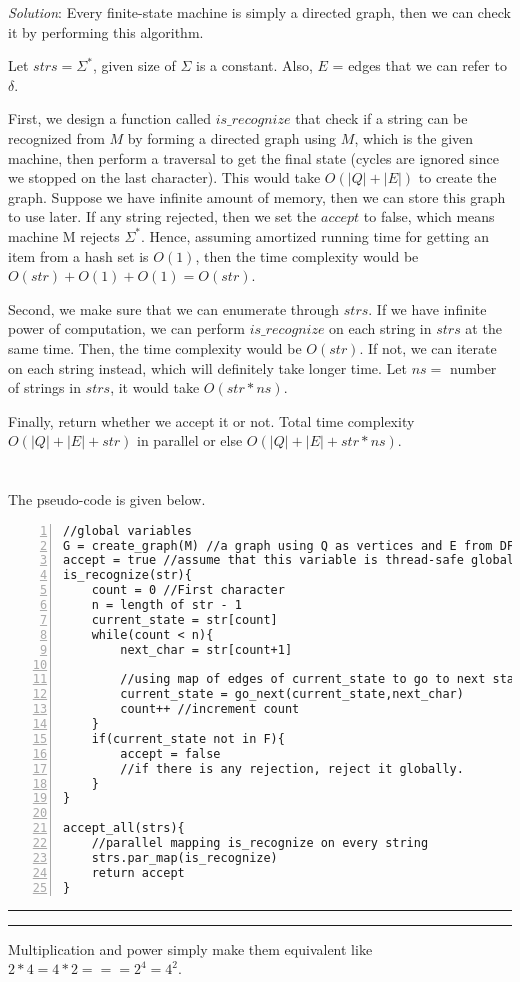 \documentclass[a4paper, 11pt]{article}
\newcommand{\question}[2] {\vspace{.25in} \hrule\vspace{0.5em}
	\noindent{\bf #1: #2} \vspace{0.5em}
	\hrule \vspace{.10in}}
\begin{document}
	{\em Solution}: Every finite-state machine is simply a directed graph, then we can check it by performing this algorithm.
	
	Let $strs = \Sigma^*$, given size of $\Sigma$ is a constant. Also, $E$ = edges that we can refer to $\delta$.
	
	First, we design a function called $is\_recognize$ that check if a string can be recognized from $M$ by forming a directed graph using $M$, which is the given machine, then perform a traversal to get the final state (cycles are ignored since we stopped on the last character). This would take $O(|Q|+|E|)$ to create the graph. Suppose we have infinite amount of memory, then we can store this graph to use later. If any string rejected, then we set the $accept$ to false, which means machine M rejects $\Sigma^*$. Hence, assuming amortized running time for getting an item from a hash set is $O(1)$, then the time complexity would be $O(str)+O(1)+O(1) = O(str)$.
	
	Second, we make sure that we can enumerate through $strs$. If we have infinite power of computation, we can perform $is\_recognize$ on each string in $strs$ at the same time. Then, the time complexity would be $O(str)$. If not, we can iterate on each string instead, which will definitely take longer time. Let $ns =$ number of strings in $strs$, it would take $O(str*{ns})$.
	
	Finally, return whether we accept it or not. Total time complexity $O(|Q|+|E|+str)$ in parallel or else $O(|Q|+|E|+str*{ns})$.
	\\\\\\
	The pseudo-code is given below.
	
\begin{Verbatim}[numbers=left]
//global variables
G = create_graph(M) //a graph using Q as vertices and E from DFA
accept = true //assume that this variable is thread-safe globally
is_recognize(str){
	count = 0 //First character
	n = length of str - 1
	current_state = str[count]
	while(count < n){
		next_char = str[count+1]
		
		//using map of edges of current_state to go to next state
		current_state = go_next(current_state,next_char)
		count++ //increment count
	}
	if(current_state not in F){
		accept = false 
		//if there is any rejection, reject it globally.
	}
}

accept_all(strs){
	//parallel mapping is_recognize on every string
	strs.par_map(is_recognize)
	return accept
}
\end{Verbatim}

	
	
	\question{6}{All The Same?}
	Multiplication and power simply make them equivalent like $2*4 = 4*2 === 2^4 = 4^2$.
	
\end{document}
